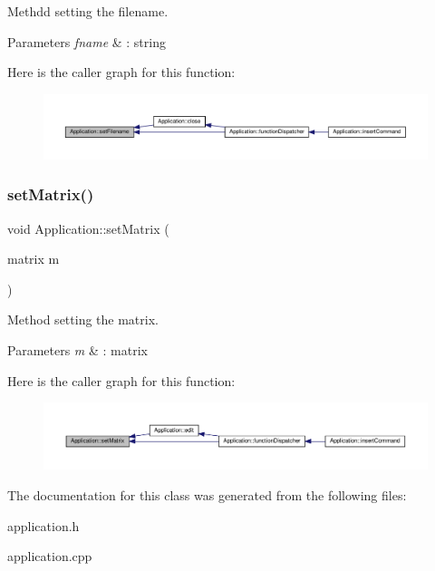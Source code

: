 Methdd setting the filename. 
\begin{DoxyParams}{Parameters}
{\em fname} & \+: string \\
\hline
\end{DoxyParams}
Here is the caller graph for this function\+:
\nopagebreak
\begin{figure}[H]
\begin{center}
\leavevmode
\includegraphics[width=350pt]{class_application_a76de879568ee39ac80484441716928d2_icgraph}
\end{center}
\end{figure}
\mbox{\label{class_application_a56b4a55e9eabd40b7f0033ba39631ebe}} 
\subsubsection{\texorpdfstring{set\+Matrix()}{setMatrix()}}
{\footnotesize\ttfamily void Application\+::set\+Matrix (\begin{DoxyParamCaption}\item[{matrix}]{m }\end{DoxyParamCaption})}

Method setting the matrix. 
\begin{DoxyParams}{Parameters}
{\em m} & \+: matrix \\
\hline
\end{DoxyParams}
Here is the caller graph for this function\+:
\nopagebreak
\begin{figure}[H]
\begin{center}
\leavevmode
\includegraphics[width=350pt]{class_application_a56b4a55e9eabd40b7f0033ba39631ebe_icgraph}
\end{center}
\end{figure}


The documentation for this class was generated from the following files\+:\begin{DoxyCompactItemize}
\item 
application.\+h\item 
application.\+cpp\end{DoxyCompactItemize}
